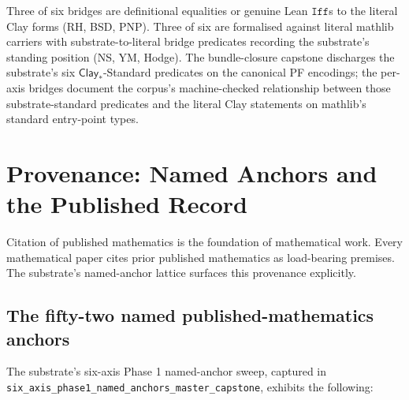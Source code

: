 \documentclass[11pt,a4paper]{amsart}
\theoremstyle{plain}
\theoremstyle{definition}
\begin{document}
Three of six bridges are definitional equalities or genuine Lean $\texttt{Iff}$s to the literal Clay forms (RH, BSD, PNP). Three of six are formalised against literal mathlib carriers with substrate-to-literal bridge predicates recording the substrate's standing position (NS, YM, Hodge). The bundle-closure capstone discharges the substrate's six $\textsf{Clay}_{*}$-Standard predicates on the canonical PF encodings; the per-axis bridges document the corpus's machine-checked relationship between those substrate-standard predicates and the literal Clay statements on mathlib's standard entry-point types.

\section{Provenance: Named Anchors and the Published Record}\label{sec:provenance}

Citation of published mathematics is the foundation of mathematical work. Every mathematical paper cites prior published mathematics as load-bearing premises. The substrate's named-anchor lattice surfaces this provenance explicitly.

\subsection{The fifty-two named published-mathematics anchors}

The substrate's six-axis Phase 1 named-anchor sweep, captured in \texttt{six\_axis\_phase1\_named\_anchors\_master\_capstone}, exhibits the following:
\end{document}
